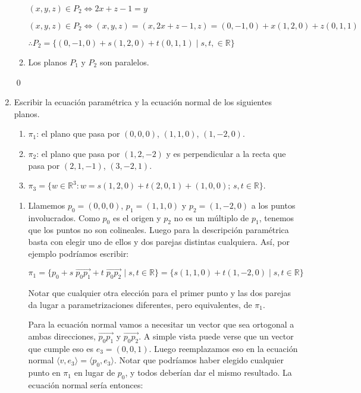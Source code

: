 \begin{enumerate}[resume,topsep=6pt, itemsep=.4cm]
\begin{enumerate}
$ (x,y,z) \in P_2 \iff 2x+z-1 = y$	

$ (x,y,z) \in P_2 \iff (x,y,z) = (x,2x+z-1,z) = (0,-1,0) + x (1,2,0) + z (0,1,1)$	

$ \therefore \boxed{ P_2 = \{ (0,-1,0) + s (1,2,0) + t (0,1,1) \; | \; s,t, \in \mathbb{R} \} }$

	\item Los planos $P_1$ y $P_2$ son paralelos.
\end{enumerate}

\qed

\item\label{ej-planos} Escribir la ecuación paramétrica  y la ecuación normal de los siguientes planos.
\begin{enumerate}
	\item $\pi_1$: el plano que pasa por $(0,0,0)$, $(1,1,0)$, $(1,-2,0)$.
	\item $\pi_2$: el plano que pasa por $(1,2,-2)$ y es perpendicular a la
	recta que pasa por $(2,1,-1)$, $(3,-2,1)$.
	\item\label{ej-planos-c}  $\pi_3=\{w\in\mathbb{R}^3: w=s(1,2,0)+t(2,0,1)+(1,0,0);\,s,t\in \mathbb R\}$.
\end{enumerate}

\rta

\begin{enumerate}
	\item Llamemos $p_0=(0,0,0)$, $p_1=(1,1,0)$ y $p_2=(1,-2,0)$ a los puntos involucrados. Como $p_0$ es el origen y $p_2$ no es un múltiplo de $p_1$, tenemos que los puntos no son colineales. Luego para la descripción paramétrica basta con elegir uno de ellos y dos parejas distintas cualquiera. Así, por ejemplo podríamos escribir:
	
$\pi_1 = \{ p_0 + s \; \overrightarrow{p_0 p_1} + t \; \overrightarrow{p_0 p_2} \; | \; s,t \in \mathbb{R} \}  = \boxed{ \{ s (1,1,0) + t (1,-2,0) \; | \; s,t \in \mathbb{R} \} }$

Notar que cualquier otra elección para el primer punto y las dos parejas da lugar a parametrizaciones diferentes, pero equivalentes, de $\pi_1$.

Para la ecuación normal vamos a necesitar un vector que sea ortogonal a ambas direcciones, $\overrightarrow{p_0 p_1}$ y $\overrightarrow{p_0 p_2}$. A simple vista puede verse que un vector que cumple eso es $e_3 = (0,0,1)$. Luego reemplazamos eso en la ecuación normal $\langle v,e_3 \rangle = \langle p_0, e_3 \rangle$. Notar que podríamos haber elegido cualquier punto en $\pi_1$ en lugar de $p_0$, y todos deberían dar el mismo resultado. La ecuación normal sería entonces:


\end{enumerate}
\end{enumerate}
